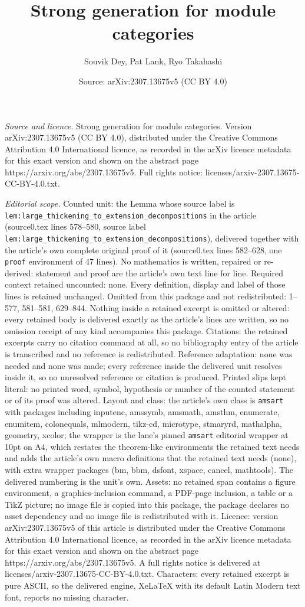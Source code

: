 \documentclass[10pt,a4paper]{amsart}
\title[Strong generation for module categories]{Strong generation for module categories}
\author{Souvik Dey, Pat Lank, Ryo Takahashi}
\date{Source: arXiv:2307.13675v5 (CC BY 4.0)}
\begin{document}
\maketitle

\noindent\emph{Source and licence.} Strong generation for module categories. Version arXiv:2307.13675v5 (CC BY 4.0), distributed under the Creative Commons Attribution 4.0 International licence, as recorded in the arXiv licence metadata for this exact version and shown on the abstract page https://arxiv.org/abs/2307.13675v5. Full rights notice: licenses/arxiv-2307.13675-CC-BY-4.0.txt.\par\smallskip

\noindent\textit{Editorial scope.} Counted unit: the Lemma whose source label is \texttt{lem:large\_thickening\_to\_extension\_decompositions} in the article (source0.tex lines 578--580, source label \texttt{lem:large\_thickening\_to\_extension\_decompositions}), delivered together with the article's own complete original proof of it (source0.tex lines 582--628, one \texttt{proof} environment of 47 lines). No mathematics is written, repaired or re-derived: statement and proof are the article's own text line for line. Required context retained uncounted: none. Every definition, display and label of those lines is retained unchanged. Omitted from this package and not redistributed: 1--577, 581--581, 629--844. Nothing inside a retained excerpt is omitted or altered: every retained body is delivered exactly as the article's lines are written, so no omission receipt of any kind accompanies this package. Citations: the retained excerpts carry no citation command at all, so no bibliography entry of the article is transcribed and no reference is redistributed. Reference adaptation: none was needed and none was made; every reference inside the delivered unit resolves inside it, so no unresolved reference or citation is produced. Printed slips kept literal: no printed word, symbol, hypothesis or number of the counted statement or of its proof was altered. Layout and class: the article's own class is \texttt{amsart} with packages including inputenc, amssymb, amsmath, amsthm, enumerate, enumitem, colonequals, mlmodern, tikz-cd, microtype, stmaryrd, mathalpha, geometry, xcolor; the wrapper is the lane's pinned \texttt{amsart} editorial wrapper at 10pt on A4, which restates the theorem-like environments the retained text needs and adds the article's own macro definitions that the retained text needs (none), with extra wrapper packages (bm, bbm, dsfont, xspace, cancel, mathtools). The delivered numbering is the unit's own. Assets: no retained span contains a figure environment, a graphics-inclusion command, a PDF-page inclusion, a table or a TikZ picture; no image file is copied into this package, the package declares no asset dependency and no image file is redistributed with it. Licence: version arXiv:2307.13675v5 of this article is distributed under the Creative Commons Attribution 4.0 International licence, as recorded in the arXiv licence metadata for this exact version and shown on the abstract page https://arxiv.org/abs/2307.13675v5. A full rights notice is delivered at licenses/arxiv-2307.13675-CC-BY-4.0.txt. Characters: every retained excerpt is pure ASCII, so the delivered engine, XeLaTeX with its default Latin Modern text font, reports no missing character.
\end{document}
